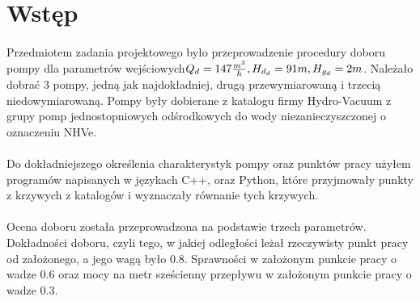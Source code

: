 \section{Wstęp}
\paragraph{}{Przedmiotem zadania projektowego było przeprowadzenie procedury doboru pompy dla parametrów wejściowych\(Q_d=147\frac{m^3}{h}, H_{d_d}=91 m, H_{g_d}=2 m \).
Należało dobrać 3 pompy, jedną jak najdokładniej, drugą przewymiarowaną i trzecią niedowymiarowaną.
Pompy były dobierane z katalogu firmy Hydro-Vacuum z grupy pomp jednostopniowych odśrodkowych do wody niezanieczyszczonej o oznaczeniu NHVe.}
\paragraph{}{Do dokładniejszego określenia charakterystyk pompy oraz punktów pracy użyłem programów napisanych w językach C++, oraz Python, które przyjmowały punkty z krzywych z katalogów i wyznaczały równanie tych krzywych.}
\paragraph{}{Ocena doboru została przeprowadzona na podstawie trzech parametrów.
Dokładności doboru, czyli tego, w jakiej odległości leżał rzeczywisty punkt pracy od założonego, a jego wagą było 0.8. Sprawności w założonym punkcie pracy o wadze 0.6 oraz mocy na metr sześcienny przepływu w założonym punkcie pracy o wadze 0.3.}
